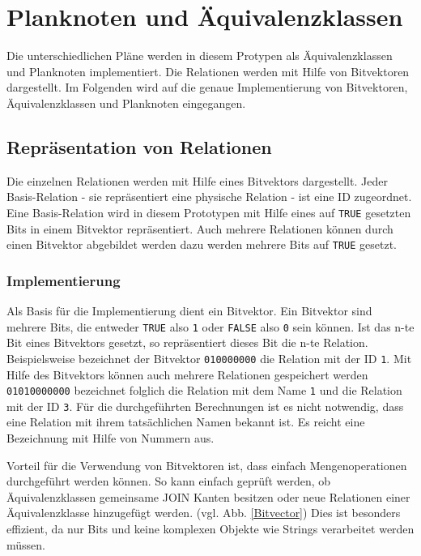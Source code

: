 \section{Planknoten und Äquivalenzklassen}

Die unterschiedlichen Pläne werden in diesem Protypen als Äquivalenzklassen und Planknoten implementiert. Die Relationen werden mit Hilfe von Bitvektoren dargestellt. Im Folgenden wird auf die genaue Implementierung von Bitvektoren, Äquivalenzklassen und Planknoten eingegangen.

\subsection{Repräsentation von Relationen}
\label{sec:Bitvector}

Die einzelnen Relationen werden mit Hilfe eines Bitvektors dargestellt. Jeder Basis-Relation - sie repräsentiert eine physische Relation - ist eine ID zugeordnet. Eine Basis-Relation wird in diesem Prototypen mit Hilfe eines auf \texttt{TRUE} gesetzten Bits in einem Bitvektor repräsentiert. Auch mehrere Relationen können durch einen Bitvektor abgebildet werden dazu werden mehrere Bits auf \texttt{TRUE} gesetzt.

\subsubsection{Implementierung}

Als Basis für die Implementierung dient ein Bitvektor. Ein Bitvektor sind mehrere Bits, die entweder \texttt{TRUE} also \texttt{1} oder \texttt{FALSE} also \texttt{0} sein können. Ist das n-te Bit eines Bitvektors gesetzt, so repräsentiert dieses Bit die n-te Relation. Beispielsweise bezeichnet der Bitvektor \texttt{010000000} die Relation mit der ID \texttt{1}. Mit Hilfe des Bitvektors können auch mehrere Relationen gespeichert werden \texttt{01010000000} bezeichnet folglich die Relation mit dem Name \texttt{1} und die Relation mit der ID \texttt{3}. Für die durchgeführten Berechnungen ist es nicht notwendig, dass eine Relation mit ihrem tatsächlichen Namen bekannt ist. Es reicht eine Bezeichnung mit Hilfe von Nummern aus.

Vorteil für die Verwendung von Bitvektoren ist, dass einfach Mengenoperationen durchgeführt werden können. So kann einfach geprüft werden, ob Äquivalenzklassen gemeinsame JOIN Kanten besitzen oder neue Relationen einer Äquivalenzklasse hinzugefügt werden. (vgl. Abb. \ref{Bitvector}) Dies ist besonders effizient, da nur Bits und keine komplexen Objekte wie Strings verarbeitet werden müssen.



